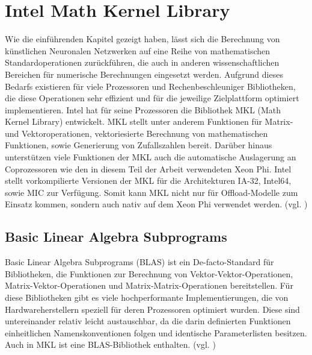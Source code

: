 \documentclass[../main.tex]{subfiles}
\begin{document}
\section{Intel Math Kernel Library}
Wie die einführenden Kapitel gezeigt haben, lässt sich die Berechnung von künstlichen Neuronalen Netzwerken auf eine Reihe von mathematischen Standardoperationen zurückführen, die auch in anderen wissenschaftlichen Bereichen für numerische Berechnungen eingesetzt werden. Aufgrund dieses Bedarfs existieren für viele Prozessoren und Rechenbeschleuniger Bibliotheken, die diese Operationen sehr effizient und für die jeweilige Zielplattform optimiert implementieren. Intel hat für seine Prozessoren die Bibliothek MKL (Math Kernel Library) entwickelt. MKL stellt unter anderem Funktionen für Matrix- und Vektoroperationen, vektoriesierte Berechnung von mathematischen Funktionen, sowie Generierung von Zufallszahlen bereit. Darüber hinaus unterstützen viele Funktionen der MKL auch die automatische Auslagerung an Coprozessoren wie den in diesem Teil der Arbeit verwendeten Xeon Phi. Intel stellt vorkompilierte Versionen der MKL für die Architekturen IA-32, Intel64, sowie MIC zur Verfügung. Somit kann MKL nicht nur für Offload-Modelle zum Einsatz kommen, sondern auch nativ auf dem Xeon Phi verwendet werden. (vgl. \cite{MKLdevReference})

\subsection{Basic Linear Algebra Subprograms}
Basic Linear Algebra Subprograms (BLAS) ist ein De-facto-Standard für Bibliotheken, die Funktionen zur Berechnung von Vektor-Vektor-Operationen, Matrix-Vektor-Operationen und Matrix-Matrix-Operationen bereitstellen. Für diese Bibliotheken gibt es viele hochperformante Implementierungen, die von Hardwareherstellern speziell für deren Prozessoren optimiert wurden. Diese sind untereinander relativ leicht austauschbar, da die darin definierten Funktionen einheitlichen Namenskonventionen folgen und identische Parameterlisten besitzen. Auch in MKL ist eine BLAS-Bibliothek enthalten. (vgl. \cite{MKLdevReference})
\end{document}
